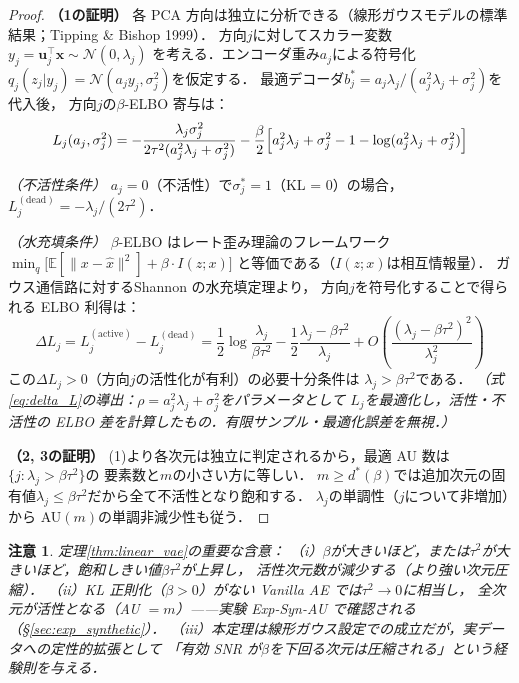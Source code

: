 \documentclass[11pt,a4paper]{jsarticle}
\newtheorem{remark}{注意}
\begin{document}
\begin{proof}
\textbf{（1の証明）}
各 PCA 方向は独立に分析できる（線形ガウスモデルの標準結果；Tipping \& Bishop 1999）．
方向$j$に対してスカラー変数$y_j = \boldsymbol{u}_j^\top \boldsymbol{x} \sim \mathcal{N}(0, \lambda_j)$
を考える．エンコーダ重み$a_j$による符号化$q_j(z_j|y_j) = \mathcal{N}(a_j y_j, \sigma_j^2)$を仮定する．
最適デコーダ$b_j^* = a_j\lambda_j/(a_j^2\lambda_j + \sigma_j^2)$を代入後，
方向$j$の$\beta$-ELBO 寄与は：
\begin{equation}
  L_j(a_j, \sigma_j^2)
  = -\frac{\lambda_j \sigma_j^2}{2\tau^2(a_j^2\lambda_j + \sigma_j^2)}
    - \frac{\beta}{2}\Bigl[a_j^2\lambda_j + \sigma_j^2 - 1 - \log(a_j^2\lambda_j + \sigma_j^2)\Bigr]
  \label{eq:elbo_j}
\end{equation}

\textit{（不活性条件）}
$a_j = 0$（不活性）で$\sigma_j^* = 1$（KL = 0）の場合，$L_j^{(\mathrm{dead})} = -\lambda_j/(2\tau^2)$．

\textit{（水充填条件）}
$\beta$-ELBO はレート歪み理論\cite{cover2006elements}のフレームワーク
$\min_{q}\bigl[\mathbb{E}[\|x - \hat{x}\|^2] + \beta \cdot I(z;x)\bigr]$
と等価である（$I(z;x)$は相互情報量）．
ガウス通信路に対するShannon の水充填定理\cite{cover2006elements}より，
方向$j$を符号化することで得られる ELBO 利得は：
\begin{equation}
  \Delta L_j = L_j^{(\mathrm{active})} - L_j^{(\mathrm{dead})}
  = \frac{1}{2}\log\frac{\lambda_j}{\beta\tau^2} - \frac{1}{2}\frac{\lambda_j - \beta\tau^2}{\lambda_j} + O\!\left(\frac{(\lambda_j - \beta\tau^2)^2}{\lambda_j^2}\right)
  \label{eq:delta_L}
\end{equation}
この$\Delta L_j > 0$（方向$j$の活性化が有利）の必要十分条件は
$\lambda_j > \beta\tau^2$である．
\textit{（式\eqref{eq:delta_L}の導出：$\rho = a_j^2\lambda_j + \sigma_j^2$をパラメータとして
$L_j$を最適化し，活性・不活性の ELBO 差を計算したもの．有限サンプル・最適化誤差を無視．）}

\textbf{（2, 3の証明）}
(1)より各次元は独立に判定されるから，最適 AU 数は$\{j : \lambda_j > \beta\tau^2\}$の
要素数と$m$の小さい方に等しい．
$m \geq d^*(\beta)$では追加次元の固有値$\lambda_j \leq \beta\tau^2$だから全て不活性となり飽和する．
$\lambda_j$の単調性（$j$について非増加）から AU$(m)$の単調非減少性も従う．
\end{proof}

\begin{remark}
定理\ref{thm:linear_vae}の重要な含意：
（i）$\beta$が大きいほど，または$\tau^2$が大きいほど，飽和しきい値$\beta\tau^2$が上昇し，
活性次元数が減少する（より強い次元圧縮）．
（ii）KL 正則化（$\beta > 0$）がない Vanilla AE では$\tau^2 \to 0$に相当し，
全次元が活性となる（AU $= m$）——実験 Exp-Syn-AU で確認される（§\ref{sec:exp_synthetic}）．
（iii）本定理は線形ガウス設定での成立だが，実データへの定性的拡張として
「有効 SNR が$\beta$を下回る次元は圧縮される」という経験則を与える．
\end{remark}
\end{document}
